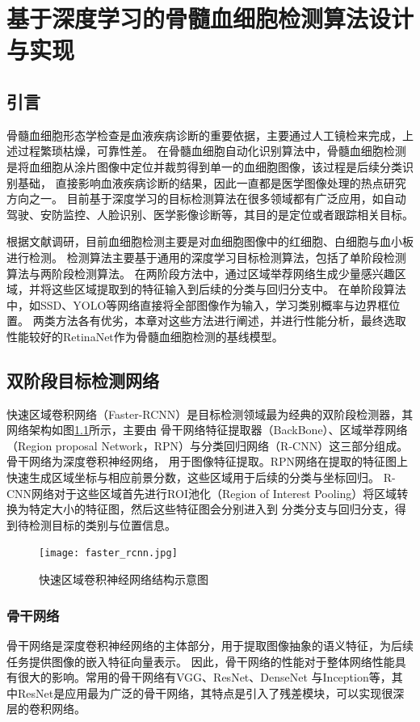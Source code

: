 
\chapter{基于深度学习的骨髓血细胞检测算法设计与实现}
\section{引言}
骨髓血细胞形态学检查是血液疾病诊断的重要依据，主要通过人工镜检来完成，上述过程繁琐枯燥，可靠性差。
在骨髓血细胞自动化识别算法中，骨髓血细胞检测是将血细胞从涂片图像中定位并裁剪得到单一的血细胞图像，该过程是后续分类识别基础，
直接影响血液疾病诊断的结果，因此一直都是医学图像处理的热点研究方向之一。
目前基于深度学习的目标检测算法在很多领域都有广泛应用，如自动驾驶、安防监控、人脸识别、医学影像诊断等，其目的是定位或者跟踪相关目标。

根据文献调研，目前血细胞检测主要是对血细胞图像中的红细胞、白细胞与血小板进行检测。
检测算法主要基于通用的深度学习目标检测算法，包括了单阶段检测算法与两阶段检测算法。
在两阶段方法中，通过区域举荐网络生成少量感兴趣区域，并将这些区域提取到的特征输入到后续的分类与回归分支中。
在单阶段算法中，如SSD\cite{liu2016ssd}、YOLO\cite{redmon2016you}等网络直接将全部图像作为输入，学习类别概率与边界框位置。
两类方法各有优劣，本章对这些方法进行阐述，并进行性能分析，最终选取性能较好的RetinaNet作为骨髓血细胞检测的基线模型。


\section{双阶段目标检测网络}
\label{section:faster-rcnn}
快速区域卷积网络（Faster-RCNN）是目标检测领域最为经典的双阶段检测器，其网络架构如图\ref{fig:faster_rcnn}所示，主要由
骨干网络特征提取器（BackBone）、区域举荐网络（Region proposal Network，RPN）与分类回归网络（R-CNN）这三部分组成。骨干网络为深度卷积神经网络，
用于图像特征提取。RPN网络在提取的特征图上快速生成区域坐标与相应前景分数，这些区域用于后续的分类与坐标回归。
R-CNN网络对于这些区域首先进行ROI池化（Region of Interest Pooling）将区域转换为特定大小的特征图，然后这些特征图会分别进入到
分类分支与回归分支，得到待检测目标的类别与位置信息。

\begin{figure}[htbp]  
   \centering   
   \texttt{[image: faster\_rcnn.jpg]}   
   \caption{快速区域卷积神经网络结构示意图}   
   \label{fig:faster_rcnn} 
\end{figure}  

\subsection{骨干网络}
骨干网络是深度卷积神经网络的主体部分，用于提取图像抽象的语义特征，为后续任务提供图像的嵌入特征向量表示。
因此，骨干网络的性能对于整体网络性能具有很大的影响。常用的骨干网络有VGG\cite{simonyan2014very}、ResNet\cite{he2016deep}、DenseNet\cite{huang2017densely}
与Inception\cite{szegedy2015going}等，其中ResNet是应用最为广泛的骨干网络，其特点是引入了残差模块，可以实现很深层的卷积网络。

